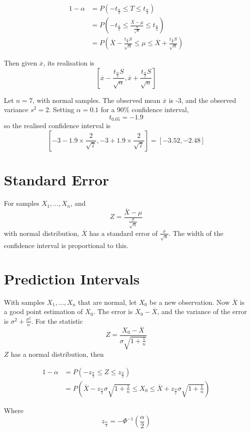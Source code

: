 \documentclass[12pt]{article}
\begin{document}
\begin{align*}
	1 - \alpha &= P\left(-t_{\frac{\alpha}{2}} \leq T \leq t_{\frac{\alpha}{2}}\right) \\
		   &= P\left(-t_{\frac{\alpha}{2}} \leq \frac{\overline{X}-\mu}{\frac{S}{\sqrt{n}}} \leq t_{\frac{\alpha}{2}}\right) \\
		   &= P\left(\overline{X} - \frac{t_{\frac{\alpha}{2}}S}{\sqrt{n}} \leq \mu \leq \overline{X} + \frac{t_{\frac{\alpha}{2}}S}{\sqrt{n}}\right)
\end{align*}

Then given $\overline{x}$, its realisation is
$$\left[\overline{x} - \frac{t_{\frac{\alpha}{2}}S}{\sqrt{n}}, \overline{x} + \frac{t_{\frac{\alpha}{2}}S}{\sqrt{n}}\right]$$

\begin{ex}
	Let $n=7$, with normal samples. The observed mean $\overline{x}$ is -3, and the observed variance $s^2 = 2$. Setting $\alpha=0.1$ for a 90\% confidence interval,
	$$t_{0.05} = -1.9$$
	so the realised confidence interval is
	$$\left[-3-1.9\times\frac{2}{\sqrt{7}},-3+1.9\times\frac{2}{\sqrt{7}}\right] = [-3.52,-2.48]$$
\end{ex}

\section{Standard Error}

For samples $X_1,\dots,X_n$, and
$$Z = \frac{\overline{X}-\mu}{\frac{\sigma}{\sqrt{n}}}$$
with normal distribution, $\overline{X}$ has a standard error of $\frac{\sigma}{\sqrt{n}}$. The width of the confidence interval is proportional to this.

\section{Prediction Intervals}

With samples $X_1,\dots,X_n$ that are normal, let $X_0$ be a new observation. Now $\overline{X}$ is a good point estimation of $X_0$. The error is $X_0 - \overline{X}$, and the variance of the error is $\sigma^2 + \frac{\sigma^2}{n}$. For the statistic
$$Z = \frac{X_0-\overline{X}}{\sigma\sqrt{1+\frac{1}{n}}}$$
$Z$ has a normal distribution, then

\begin{align*}
	1 - \alpha &= P(-z_{\frac{\alpha}{2}} \leq Z \leq z_{\frac{\alpha}{2}}) \\
		   &= P\left(\overline{X} - z_{\frac{\alpha}{2}}\sigma\sqrt{1+\frac{1}{n}} \leq X_0 \leq \overline{X} + z_{\frac{\alpha}{2}}\sigma\sqrt{1+\frac{1}{n}}\right)
\end{align*}

Where
$$z_{\frac{\alpha}{2}} = -\Phi^{-1}\left(\frac{\alpha}{2}\right)$$
\end{document}
